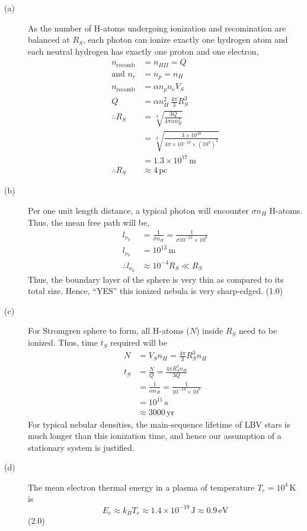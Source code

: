 \begin{description}
\item[(a)] As the number of H-atoms undergoing ionization and recomination %
  are balanced at $R_S$, each photon can ionize exactly one hydrogen atom and
  each neutral hydrogen has exactly one proton and one electron,
  \begin{align*}
    n_{\mathrm{recomb}} &= n_{HII} = Q\\
    \text{and } n_e &= n_p = n_H \tag*{(2.0)}\\
    n_{\mathrm{recomb}} &= \alpha n_p n_e V_S\\
    Q &= \alpha n_H^2\,\frac{4\pi}{3}R_S^3 \tag*{(1.0)}\\
    \therefore R_S &= \sqrt[3]{\frac{3Q}{4\pi\alpha n_H^2}} \tag*{(1.0)}\\
      &= \sqrt[3]{\frac{3\times10^{49}}{4\pi\times10^{-19}\times(10^{8})^2}}\\
      &= 1.3\times10^{17}\,\mathrm{m}\\
    \therefore R_S &\approx 4\,\mathrm{pc} \tag*{(1.0)}
  \end{align*}
\item[(b)] Per one unit length distance, a typical photon will encounter
  $\sigma n_H$ H-atoms. Thus, the mean free path will be,
  \begin{align*}
    l_{\nu_0} &= \frac{1}{\sigma n_H} = \frac{1}{\sigma 10^{-21}\times10^{8}}
    \\
    l_{\nu_0} &= 10^{13}\,\mathrm{m} \tag*{(2.0)}\\
    \therefore l_{\nu_0} &\approx 10^{-4}R_S \ll R_S
  \end{align*}
  Thus, the boundary layer of the sphere is very thin as compared to its total
  size. Hence, ``YES'' this ionized nebula is very sharp-edged. \hfill(1.0)
\item[(c)] For Stromgren sphere to form, all H-atoms ($N$) inside $R_S$ need
  to be ionized. Thus, time $t_S$ required will be
  \begin{align*}
    N &= V_S n_H = \frac{4\pi}{3}R_S^3 n_H \tag*{(1.0)}\\
    t_S &= \frac{N}{Q} = \frac{4\pi R_S^3 n_H}{3Q} \tag*{(1.0)}\\
        &= \frac{1}{\alpha n_H} = \frac{1}{10^{-19}\times10^{8}}\\
        &= 10^{11}\,\mathrm{s}\\
        &\approx 3000\,\mathrm{yr} \tag*{(2.0)}
  \end{align*}
  For typical nebular densities, the main-sequence lifetime of LBV stars is
  much longer than this ionization time, and hence our assumption of a
  stationary system is justified.
\item[(d)] The mean electron thermal energy in a plasma of temperature
  $T_e = 10^4$\,K is
  \[
    E_e \approx k_B T_e \approx 1.4\times10^{-19}\,\mathrm{J}
        \approx 0.9\,\mathrm{eV}
  \]
  \hfill(2.0)


\end{description}
